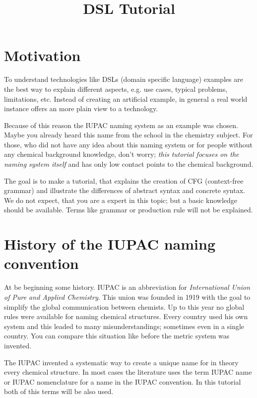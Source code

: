 \documentclass[a4paper,10pt]{article}
\title{DSL Tutorial}
\author{}
\newcommand{\gerquot}[1]{\glqq#1\grqq}
\newcommand{\dashAndSpace}{\textendash \space}
\newcommand{\dashAndSpaceSeq}[1]{\dashAndSpace#1 \textendash}
\newcommand{\DSL}{domain specific language}
\newcommand{\CFG}{context-free grammar}
\newcommand{\IUPAC}{International Union of Pure and Applied Chemistry}
\begin{document}
\maketitle

\section{Motivation}\label{s:Motivation}
To understand technologies like DSLs (\DSL) examples are the best way to explain different aspects, e.g. use cases, typical problems, limitations, etc. Instead of creating an artificial example, in general a real world instance offers an more plain view to a technology.

Because of this reason the IUPAC naming system as an example was chosen. Maybe you already heard this name from the school in the chemistry subject. For those, who did not have any idea about this naming system or for people without any chemical background knowledge, don't worry; \emph{this tutorial focuses on the naming system itself} and has only low contact points to the chemical background.

The goal is to make a tutorial, that explains the creation of CFG (\CFG) and illustrate the differences of abstract syntax and concrete syntax. We do not expect, that you are a expert in this topic; but a basic knowledge should be available. Terms like \gerquot{grammar} or \gerquot{production rule} will not be explained.





\section{History of the IUPAC naming convention}\label{s:HistoryOfTheIUPACNamingConvention}
At be beginning some history. IUPAC is an abbreviation for \emph{\IUPAC}. This union was founded in 1919 with the goal to simplify the global communication between chemists. Up to this year no global rules were available for naming chemical structures. Every country used his own system and this leaded to many misunderstandings; sometimes even in a single country. You can compare this situation like before the metric system was invented.

The IUPAC invented a systematic way to create a unique name for \dashAndSpaceSeq{in theory} every chemical structure. In most cases the literature uses the term \gerquot{IUPAC name} or \gerquot{IUPAC nomenclature} for a name in the IUPAC convention. In this tutorial both of this terms will be also used.
\end{document}
